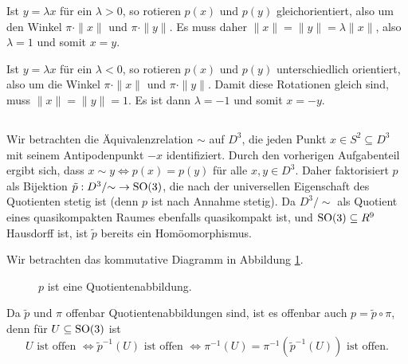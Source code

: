 \documentclass[a4paper,10pt]{article}
\begin{document}
Ist $y = \lambda x$ für ein $\lambda > 0$, so rotieren $p(x)$ und $p(y)$ gleichorientiert, also um den Winkel $\pi \cdot \|x\|$ und $\pi \cdot \|y\|$. Es muss daher $\|x\| = \|y\| = \lambda \|x\|$, also $\lambda = 1$ und somit $x = y$.

Ist $y = \lambda x$ für ein $\lambda < 0$, so rotieren $p(x)$ und $p(y)$ unterschiedlich orientiert, also um die Winkel $\pi \cdot \|x\|$ und $\pi \cdot \|y\|$. Damit diese Rotationen gleich sind, muss $\|x\| = \|y\| = 1$. Es ist dann $\lambda = -1$ und somit $x = -y$.


\addtocounter{subsection}{-1}
\subsection{}
Wir betrachten die Äquivalenzrelation $\sim$ auf $D^3$, die jeden Punkt $x \in S^2 \subseteq D^3$ mit seinem Antipodenpunkt $-x$ identifiziert. Durch den vorherigen Aufgabenteil ergibt sich, dass $x \sim y \Leftrightarrow p(x) = p(y)$ für alle $x,y \in D^3$. Daher faktorisiert $p$ als Bijektion $\tilde{p} : D^3/{\sim} \to \operatorname{SO}(3)$, die nach der universellen Eigenschaft des Quotienten stetig ist (denn $p$ ist nach Annahme stetig). Da $D^3/{\sim}$ als Quotient eines quasikompakten Raumes ebenfalls quasikompakt ist, und $\operatorname{SO}(3) \subseteq R^9$ Hausdorff ist, ist $\tilde{p}$ bereits ein Homöomorphismus.

Wir betrachten das kommutative Diagramm in Abbildung \ref{fig: p Quotientenabbildung}.
\begin{figure}\centering
 \caption{$p$ ist eine Quotientenabbildung.}
 \label{fig: p Quotientenabbildung}
\end{figure}
Da $\tilde{p}$ und $\pi$ offenbar Quotientenabbildungen sind, ist es offenbar auch $p = \tilde{p} \circ \pi$, denn für $U \subseteq \operatorname{SO}(3)$ ist
\[
 U \text{ ist offen }
 \Leftrightarrow \tilde{p}^{-1}(U) \text{ ist offen }
 \Leftrightarrow \pi^{-1}(U) = \pi^{-1}\left(\tilde{p}^{-1}(U)\right) \text{ ist offen}.
\]
\end{document}
